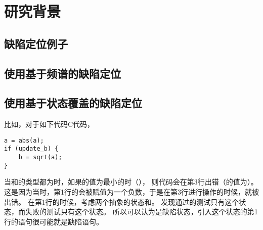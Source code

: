 \chapter{研究背景}

\section{缺陷定位例子}

\section{使用基于频谱的缺陷定位}

\section{使用基于状态覆盖的缺陷定位}

比如，对于如下代码C代码，
\lstset{language=C}
\begin{lstlisting}
a = abs(a);
if (update_b) {
    b = sqrt(a);
}
\end{lstlisting}
当和的类型都为时，如果的值为最小的时（），
则代码会在第3行出错（的值为）。
这是因为当时，第1行的会被赋值为一个负数，于是在第3行进行操作的时候，就被出错。
在第1行的时候，考虑两个抽象的状态和。
发现通过的测试只有这个状态，而失败的测试只有这个状态。
所以可以认为是缺陷状态，引入这个状态的第1行的语句很可能就是缺陷语句。
